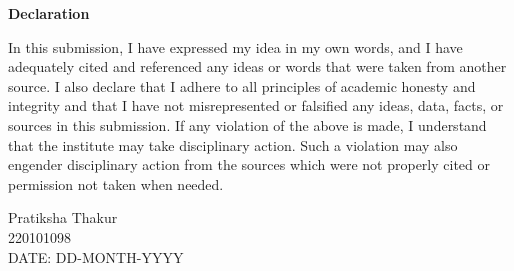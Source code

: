 \documentclass[a4paper, 11pt, oneside]{report}
\begin{document}

\begin{center}
   { \LARGE \textbf{Declaration}}
\end{center}
In this submission, I have expressed my idea in my own words, and I have adequately cited and referenced any ideas or words that were taken from another source. I also declare that I adhere to all principles of academic honesty and integrity and that I have not misrepresented or falsified any ideas, data, facts, or sources in this submission. If any violation of the above is made, I understand that the institute may take disciplinary action. Such a violation may also engender disciplinary action from the sources which were not properly cited or permission not taken when needed.

\vspace{1cm}\hspace{7cm} Pratiksha Thakur \\
\vspace{1cm}\hspace{9cm} 220101098 \\
\vspace{1CM} DATE: DD-MONTH-YYYY

\newpage
\end{document}
